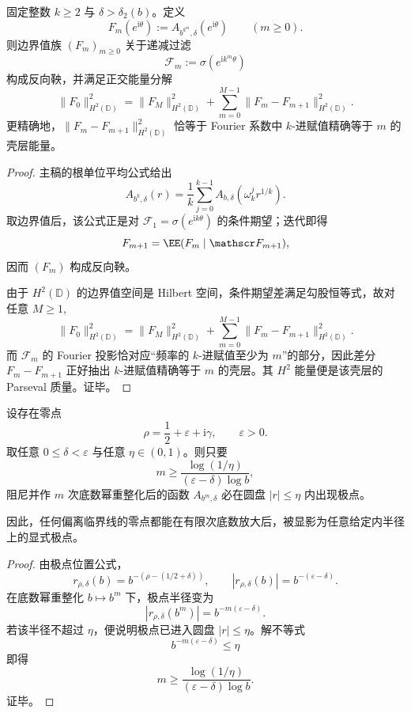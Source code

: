 \begin{theorem}\label{thm:conclusion-basepower-renormalization-reverse-martingale-kadic-splitting}
固定整数 \(k\ge 2\) 与 \(\delta>\delta_2(b)\)。定义
\[
F_m(e^{\mathrm{i}\theta}):=A_{b^{k^m},\delta}(e^{\mathrm{i}\theta})
\qquad (m\ge 0).
\]
则边界值族 \((F_m)_{m\ge 0}\) 关于递减过滤
\[
\mathscr F_m:=\sigma(e^{\mathrm{i}k^m\theta})
\]
构成反向鞅，并满足正交能量分解
\[
\|F_0\|_{H^2(\mathbb D)}^2
=
\|F_M\|_{H^2(\mathbb D)}^2
+
\sum_{m=0}^{M-1}\|F_m-F_{m+1}\|_{H^2(\mathbb D)}^2.
\]
更精确地，\(\|F_m-F_{m+1}\|_{H^2(\mathbb D)}^2\) 恰等于 Fourier 系数中 \(k\)-进赋值精确等于 \(m\) 的壳层能量。
\end{theorem}
\begin{proof}
主稿的根单位平均公式给出
\[
A_{b^k,\delta}(r)
=
\frac1k\sum_{j=0}^{k-1}A_{b,\delta}(\omega_k^j r^{1/k}).
\]
取边界值后，该公式正是对 \(\mathscr F_1=\sigma(e^{\mathrm{i}k\theta})\) 的条件期望；迭代即得
\[
F_{m+1}=\EE(F_m\mid \mathscr F_{m+1}),
\]
因而 \((F_m)\) 构成反向鞅。

由于 \(H^2(\mathbb D)\) 的边界值空间是 Hilbert 空间，条件期望差满足勾股恒等式，故对任意 \(M\ge 1\),
\[
\|F_0\|_{H^2(\mathbb D)}^2
=
\|F_M\|_{H^2(\mathbb D)}^2
+
\sum_{m=0}^{M-1}\|F_m-F_{m+1}\|_{H^2(\mathbb D)}^2.
\]
而 \(\mathscr F_m\) 的 Fourier 投影恰对应“频率的 \(k\)-进赋值至少为 \(m\)”的部分，因此差分 \(F_m-F_{m+1}\) 正好抽出 \(k\)-进赋值精确等于 \(m\) 的壳层。其 \(H^2\) 能量便是该壳层的 Parseval 质量。证毕。
\end{proof}

\begin{theorem}[离临界偏移的有限尺度内域显影]\label{thm:conclusion-offcritical-finite-scale-interior-pole-exposure}
设存在零点
\[
\rho=\frac12+\varepsilon+\mathrm{i}\gamma,
\qquad
\varepsilon>0.
\]
取任意 \(0\le \delta<\varepsilon\) 与任意 \(\eta\in(0,1)\)。则只要
\[
m\ge \frac{\log(1/\eta)}{(\varepsilon-\delta)\log b},
\]
阻尼并作 \(m\) 次底数幂重整化后的函数 \(A_{b^m,\delta}\) 必在圆盘 \(|r|\le \eta\) 内出现极点。

因此，任何偏离临界线的零点都能在有限次底数放大后，被显影为任意给定内半径上的显式极点。
\end{theorem}
\begin{proof}
由极点位置公式，
\[
r_{\rho,\delta}(b)=b^{-(\rho-(1/2+\delta))},
\qquad
|r_{\rho,\delta}(b)|=b^{-(\varepsilon-\delta)}.
\]
在底数幂重整化 \(b\mapsto b^m\) 下，极点半径变为
\[
|r_{\rho,\delta}(b^m)|
=
b^{-m(\varepsilon-\delta)}.
\]
若该半径不超过 \(\eta\)，便说明极点已进入圆盘 \(|r|\le \eta\)。解不等式
\[
b^{-m(\varepsilon-\delta)}\le \eta
\]
即得
\[
m\ge \frac{\log(1/\eta)}{(\varepsilon-\delta)\log b}.
\]
证毕。
\end{proof}

